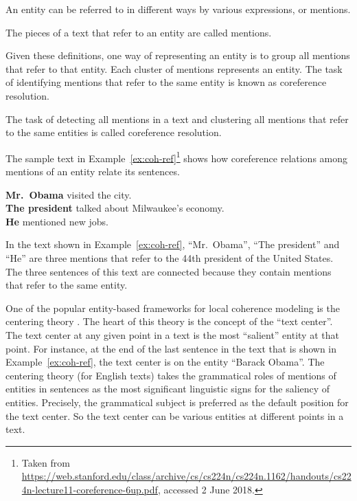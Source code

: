 An entity can be referred to in different ways by various expressions, or mentions. 

\begin{definition}
    The pieces of a text that refer to an entity are called mentions. 
\end{definition}

Given these definitions, one way of representing an entity is to group all mentions that refer to that entity. 
Each cluster of mentions represents an entity. 
The task of identifying mentions that refer to the same entity is known as coreference resolution.  

\begin{definition}
    The task of detecting all mentions in a text and clustering all mentions that refer to the same entities is called coreference resolution. 
\end{definition}

The sample text in Example~\ref{ex:coh-ref}\footnote{Taken from \url{https://web.stanford.edu/class/archive/cs/cs224n/cs224n.1162/handouts/cs224n-lecture11-coreference-6up.pdf}, accessed 2 June 2018.} shows how coreference relations among mentions of an entity relate its sentences. 

\begin{examples}
    \label{ex:coh-ref}
    \textbf{Mr.\ Obama} visited the city. \\
    \textbf{The president} talked about Milwaukee’s economy. \\
    \textbf{He} mentioned new jobs. \\
\end{examples} 

In the text shown in Example~\ref{ex:coh-ref}, ``Mr.\ Obama'', ``The president'' and ``He'' are three mentions that refer to the 44th president of the United States. 
The three sentences of this text are connected because they contain mentions that refer to the same entity. 

One of the popular entity-based frameworks for local coherence modeling is the centering theory \cite{grosz95}. 
The heart of this theory is the concept of the ``text center''. 
The text center at any given point in a text is the most ``salient'' entity at that point. 
For instance, at the end of the last sentence in the text that is shown in Example~\ref{ex:coh-ref}, the text center is on the entity ``Barack Obama''.
The centering theory (for English texts) takes the grammatical roles of mentions of entities in sentences as the most significant linguistic signs for the saliency of entities. 
Precisely, the grammatical subject is preferred as the default position for the text center. 
So the text center can be various entities at different points in a text. 

